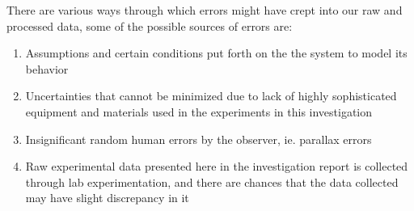 {There are various ways through which errors might have crept into our raw and processed data, some of the possible sources of errors are:}
      
      \begin{enumerate}
          \item {Assumptions and certain conditions put forth on the the system to model its behavior}          
          \item {Uncertainties that cannot be minimized due to lack of highly sophisticated equipment and materials used in the experiments in this investigation}          
          \item {Insignificant random human errors by the observer, ie. parallax errors}
          \item {Raw experimental data presented here in the investigation report is collected through lab experimentation, and there are chances that the data collected may have slight discrepancy in it}
      \end{enumerate}

